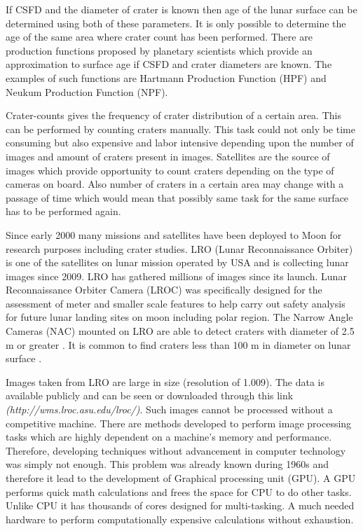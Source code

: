 \documentclass[11pt]{article}
\begin{document}
If CSFD and the diameter of crater is known then age of the lunar surface can be determined using both of these parameters. It is only possible to determine the age of the same area where crater count has been performed. There are production functions proposed by planetary scientists which provide an approximation to surface age if CSFD and crater diameters are known. The examples of such functions are Hartmann Production Function (HPF) and Neukum Production Function (NPF).

Crater-counts gives the frequency of crater distribution of a certain area. This can be performed by counting craters manually. This task could not only be time consuming but also expensive and labor intensive depending upon the number of images and amount of craters present in images. Satellites are the source of images which provide opportunity to count craters depending on the type of cameras on board. Also number of craters in a certain area may change with a passage of time which would mean that possibly same task for the same surface has to be performed again.

Since early 2000 many missions and satellites have been deployed to Moon for research purposes including crater studies. LRO (Lunar Reconnaissance Orbiter) is one of the satellites on lunar mission operated by USA and is collecting lunar images since 2009. LRO has gathered millions of images since its launch. Lunar Reconnaissance Orbiter Camera (LROC) was specifically designed for the assessment of meter and smaller scale features to help carry out safety analysis for future lunar landing sites on moon including polar region. The Narrow Angle Cameras (NAC) mounted on LRO are able to detect craters with diameter of 2.5 m or greater \cite{robinson2010lunar}. It is common to find craters less than 100 m in diameter on lunar surface \cite{robinson2010lunar}.

Images taken from LRO are large in size (resolution of 1.009). The data is available publicly and can be seen or downloaded through this link \textit{(http://wms.lroc.asu.edu/lroc/)}. 
Such images cannot be processed without a competitive machine. There are methods developed to perform image processing tasks which are highly dependent on a machine's memory and performance. Therefore, developing techniques without advancement in computer technology was simply not enough. This problem was already known during 1960s and therefore it lead to the development of Graphical processing unit (GPU). A GPU performs quick math calculations and frees the space for CPU to do other tasks. Unlike CPU it has thousands of cores designed for multi-tasking. A much needed hardware to perform computationally expensive calculations without exhaustion. 
\end{document}

